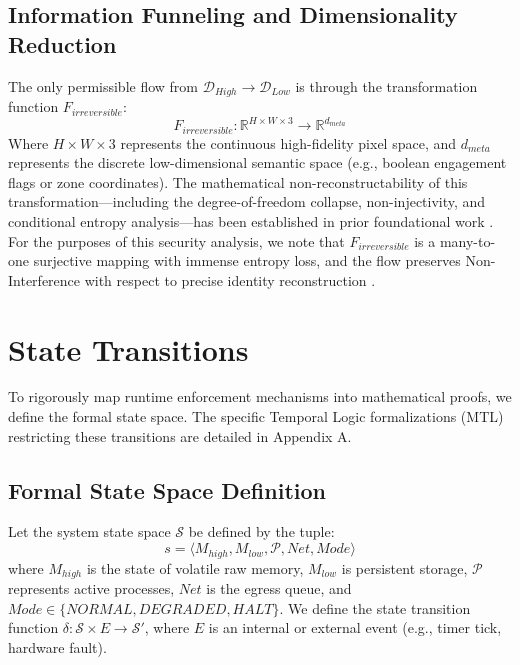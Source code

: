 \documentclass[conference]{IEEEtran}
\begin{document}
\subsection{Information Funneling and Dimensionality Reduction}
The only permissible flow from $\mathcal{D}_{High} \to \mathcal{D}_{Low}$ is through the transformation function $F_{irreversible}$:
\begin{equation}
F_{irreversible}: \mathbb{R}^{H \times W \times 3} \to \mathbb{R}^{d_{meta}}
\end{equation}
Where $H \times W \times 3$ represents the continuous high-fidelity pixel space, and $d_{meta}$ represents the discrete low-dimensional semantic space (e.g., boolean engagement flags or zone coordinates). The mathematical non-reconstructability of this transformation---including the degree-of-freedom collapse, non-injectivity, and conditional entropy analysis---has been established in prior foundational work \cite{b25_irrev, b28_pose}. For the purposes of this security analysis, we note that $F_{irreversible}$ is a many-to-one surjective mapping with immense entropy loss, and the flow preserves Non-Interference with respect to precise identity reconstruction \cite{b23}.

\section{State Transitions}
To rigorously map runtime enforcement mechanisms into mathematical proofs, we define the formal state space. The specific Temporal Logic formalizations (MTL) restricting these transitions are detailed in Appendix A.

\subsection{Formal State Space Definition}
Let the system state space $\mathcal{S}$ be defined by the tuple:
\begin{equation}
s = \langle M_{high}, M_{low}, \mathcal{P}, Net, Mode \rangle
\end{equation}
where $M_{high}$ is the state of volatile raw memory, $M_{low}$ is persistent storage, $\mathcal{P}$ represents active processes, $Net$ is the egress queue, and $Mode \in \{NORMAL, DEGRADED, HALT\}$. 
We define the state transition function $\delta : \mathcal{S} \times E \to \mathcal{S}'$, where $E$ is an internal or external event (e.g., timer tick, hardware fault). 
\end{document}
